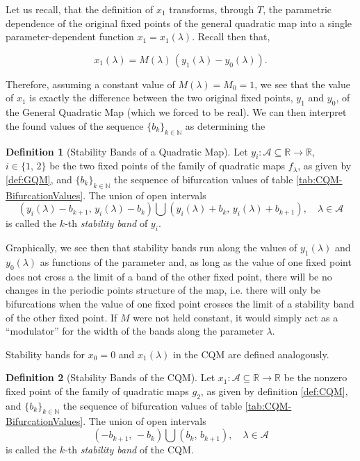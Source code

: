 \documentclass[10pt,twoside,titlepage]{book}
\numberwithin{equation}{chapter}
\numberwithin{figure}{chapter}
\numberwithin{table}{chapter}
\theoremstyle{plain}%
\theoremstyle{definition}
\newtheorem{defn}{Definition}[chapter]
\theoremstyle{remark}
\begin{document}
Let us recall, that the definition of $x_1$ transforms, through $T$, the parametric dependence of the original fixed points of the general quadratic map into a single parameter-dependent function $x_1=x_1(\lambda)$. Recall then that,

\[x_1(\lambda)=M(\lambda)\,\left(y_1(\lambda)-y_0(\lambda)\right).\]

Therefore, assuming a constant value of $M(\lambda)=M_0=1$, we see that the value of $x_1$ is exactly the difference between the two original fixed points, $y_1$ and $y_0$, of the General Quadratic Map (which we forced to be real). We can then interpret the found values of the sequence $\{b_k\}_{k\in\mathbb{N}}$ as determining the

\begin{defn}[Stability Bands of a Quadratic Map]
	Let $y_i:\mathcal{A}\subseteq\mathbb{R}\rightarrow\mathbb{R}$, $i\in\{1,\,2\}$ be the two fixed points of the family of quadratic maps $f_{\lambda}$, as given by \ref{def:GQM}, and $\{b_k\}_{k\in\mathbb{N}}$ the sequence of bifurcation values of table \ref{tab:CQM-BifurcationValues}. The union of open intervals
	\begin{equation}
		\left(y_i(\lambda)-b_{k+1},\,y_i(\lambda)-b_k\right)\bigcup\left(y_i(\lambda)+b_k,\,y_i(\lambda)+b_{k+1}\right),\quad\lambda\in\mathcal{A}
	\end{equation}
	is called the $k$-th \emph{stability band} of $y_i$.
\end{defn}

Graphically, we see then that stability bands run along the values of $y_1(\lambda)$ and $y_0(\lambda)$ as functions of the parameter and, as long as the value of one fixed point does not cross a the limit of a band of the other fixed point, there will be no changes in the periodic points structure of the map, i.e. there will only be bifurcations when the value of one fixed point crosses the limit of a stability band of the other fixed point. If $M$ were not held constant, it would simply act as a ``modulator'' for the width of the bands along the parameter $\lambda$.

Stability bands for $x_0=0$ and $x_1(\lambda)$ in the CQM are defined analogously.

\begin{defn}[Stability Bands of the CQM]
	Let $x_1:\mathcal{A}\subseteq\mathbb{R}\rightarrow\mathbb{R}$ be the nonzero fixed point of the family of quadratic maps $g_2$, as given by definition \ref{def:CQM}, and $\{b_k\}_{k\in\mathbb{N}}$ the sequence of bifurcation values of table \ref{tab:CQM-BifurcationValues}. The union of open intervals
	\begin{equation}
		\left(-b_{k+1},\,-b_k\right)\bigcup\left(b_k,\,b_{k+1}\right),\quad\lambda\in\mathcal{A}
	\end{equation}
	is called the $k$-th \emph{stability band} of the CQM.
\end{defn}
\end{document}
